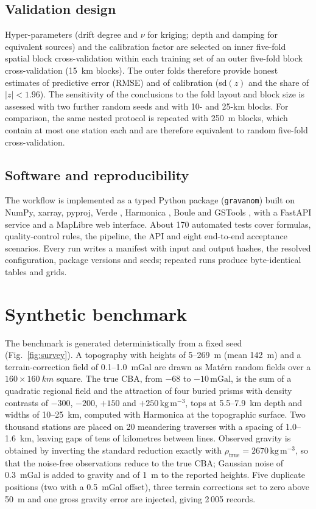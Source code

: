 \documentclass[11pt,a4paper]{article}
\newcommand{\mgal}{\ensuremath{\,\mathrm{mGal}}}
\newcommand{\kgm}{\ensuremath{\,\mathrm{kg\,m^{-3}}}}
\begin{document}
\subsection{Validation design}

Hyper-parameters (drift degree and $\nu$ for kriging; depth and damping for equivalent sources) and the calibration factor are selected on inner five-fold spatial block cross-validation within each training set of an outer five-fold block cross-validation (\SI{15}{km} blocks). The outer folds therefore provide honest estimates of predictive error (RMSE) and of calibration (sd$(z)$ and the share of $|z|<1.96$). The sensitivity of the conclusions to the fold layout and block size is assessed with two further random seeds and with 10- and 25-km blocks. For comparison, the same nested protocol is repeated with \SI{250}{m} blocks, which contain at most one station each and are therefore equivalent to random five-fold cross-validation.

\subsection{Software and reproducibility}

The workflow is implemented as a typed Python package (\texttt{gravanom}) built on NumPy, xarray, pyproj, Verde \citep{Uieda2018}, Harmonica \citep{Harmonica}, Boule \citep{Boule} and GSTools \citep{Muller2022}, with a FastAPI service and a MapLibre web interface. About 170 automated tests cover formulas, quality-control rules, the pipeline, the API and eight end-to-end acceptance scenarios. Every run writes a manifest with input and output hashes, the resolved configuration, package versions and seeds; repeated runs produce byte-identical tables and grids.

\section{Synthetic benchmark}

The benchmark is generated deterministically from a fixed seed (Fig.~\ref{fig:survey}). A topography with heights of 5--\SI{269}{m} (mean \SI{142}{m}) and a terrain-correction field of 0.1--\SI{1.0}{mGal} are drawn as Mat\'ern random fields over a $160\times\SI{160}{km}$ square. The true CBA, from $-68$ to $-10\mgal$, is the sum of a quadratic regional field and the attraction of four buried prisms with density contrasts of $-300$, $-200$, $+150$ and $+250\kgm$, tops at 5.5--\SI{7.9}{km} depth and widths of 10--\SI{25}{km}, computed with Harmonica at the topographic surface. Two thousand stations are placed on 20 meandering traverses with a spacing of 1.0--\SI{1.6}{km}, leaving gaps of tens of kilometres between lines. Observed gravity is obtained by inverting the standard reduction exactly with $\rho_\mathrm{true}=2670\kgm$, so that the noise-free observations reduce to the true CBA; Gaussian noise of \SI{0.3}{mGal} is added to gravity and of \SI{1}{m} to the reported heights. Five duplicate positions (two with a \SI{0.5}{mGal} offset), three terrain corrections set to zero above \SI{50}{m} and one gross gravity error are injected, giving 2\,005 records.
\end{document}
